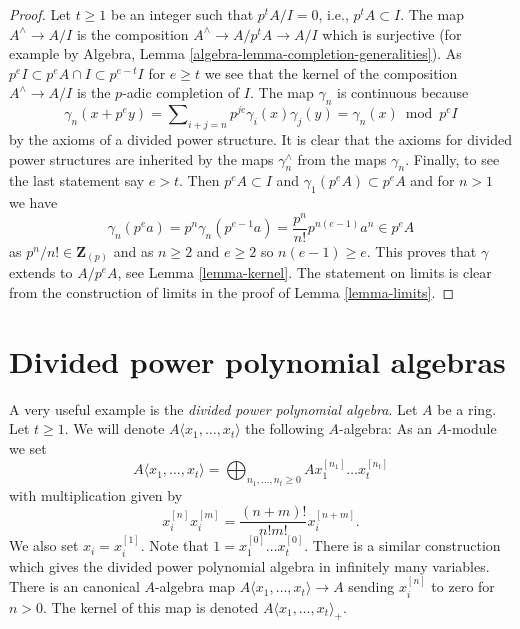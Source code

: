 \begin{proof}
Let $t \geq 1$ be an integer such that $p^tA/I = 0$, i.e., $p^tA \subset I$.
The map $A^\wedge \to A/I$ is the composition $A^\wedge \to A/p^tA \to A/I$
which is surjective (for example by
Algebra, Lemma \ref{algebra-lemma-completion-generalities}).
As $p^eI \subset p^eA \cap I \subset p^{e - t}I$ for $e \geq t$ we see
that the kernel of the composition $A^\wedge \to A/I$ is the $p$-adic
completion of $I$. The map $\gamma_n$ is continuous because
$$
\gamma_n(x + p^ey) =
\sum\nolimits_{i + j = n} p^{je}\gamma_i(x)\gamma_j(y) =
\gamma_n(x) \bmod p^eI
$$
by the axioms of a divided power structure. It is clear that the axioms
for divided power structures are inherited by the maps $\gamma_n^\wedge$
from the maps $\gamma_n$. Finally, to see the last statement say $e > t$.
Then $p^eA \subset I$ and $\gamma_1(p^eA) \subset p^eA$ and for $n > 1$
we have
$$
\gamma_n(p^ea) = p^n \gamma_n(p^{e - 1}a) = \frac{p^n}{n!} p^{n(e - 1)}a^n
\in p^e A
$$
as $p^n/n! \in \mathbf{Z}_{(p)}$ and as $n \geq 2$ and $e \geq 2$ so
$n(e - 1) \geq e$.
This proves that $\gamma$ extends to $A/p^eA$, see Lemma \ref{lemma-kernel}.
The statement on limits is clear from the construction of limits in
the proof of Lemma \ref{lemma-limits}.
\end{proof}




\section{Divided power polynomial algebras}
\label{section-divided-power-polynomial-ring}

\noindent
A very useful example is the {\it divided power polynomial algebra}.
Let $A$ be a ring. Let $t \geq 1$. We will denote
$A\langle x_1, \ldots, x_t \rangle$ the following $A$-algebra:
As an $A$-module we set
$$
A\langle x_1, \ldots, x_t \rangle =
\bigoplus\nolimits_{n_1, \ldots, n_t \geq 0} A x_1^{[n_1]} \ldots x_t^{[n_t]}
$$
with multiplication given by
$$
x_i^{[n]}x_i^{[m]} = \frac{(n + m)!}{n!m!}x_i^{[n + m]}.
$$
We also set $x_i = x_i^{[1]}$. Note that
$1 = x_1^{[0]} \ldots x_t^{[0]}$. There is a similar construction
which gives the divided power polynomial algebra in infinitely many
variables. There is an canonical $A$-algebra map
$A\langle x_1, \ldots, x_t \rangle \to A$ sending $x_i^{[n]}$ to zero
for $n > 0$. The kernel of this map is denoted
$A\langle x_1, \ldots, x_t \rangle_{+}$.

